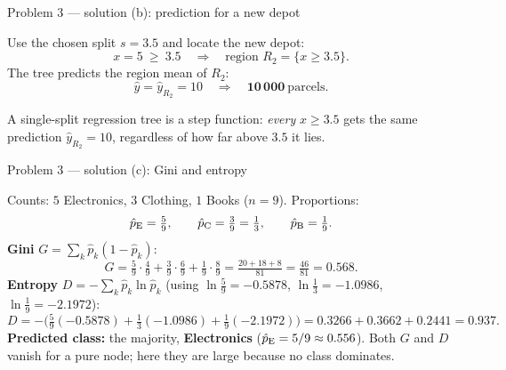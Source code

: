 \documentclass[aspectratio=169,11pt]{beamer}
\begin{document}
\begin{frame}{Problem 3 --- solution (b): prediction for a new depot}
  \begin{solutionbox}[Solution P3(b) --- predict for {$x=5$} vans]
    Use the chosen split $s=3.5$ and locate the new depot:
    \[
      x=5\ \ge\ 3.5\quad\Longrightarrow\quad\text{region }R_2=\{x\ge3.5\}.
    \]
    The tree predicts the region mean of $R_2$:
    \[
      \hat y=\hat y_{R_2}=10\quad\Longrightarrow\quad\mathbf{10\,000}\ \text{parcels}.
    \]
    \begin{takeaway}
      A single-split regression tree is a step function: \emph{every} $x\ge3.5$ gets the same
      prediction $\hat y_{R_2}=10$, regardless of how far above $3.5$ it lies.
    \end{takeaway}
  \end{solutionbox}
\end{frame}

\begin{frame}{Problem 3 --- solution (c): Gini and entropy}
  \begin{solutionbox}
    Counts: $5$ Electronics, $3$ Clothing, $1$ Books ($n=9$). Proportions:
    \[
      \hat p_{\text E}=\tfrac59,\qquad\hat p_{\text C}=\tfrac39=\tfrac13,\qquad
      \hat p_{\text B}=\tfrac19.
    \]
    \textbf{Gini} $G=\sum_k\hat p_k(1-\hat p_k)$:
    \[
      G=\tfrac59\cdot\tfrac49+\tfrac39\cdot\tfrac69+\tfrac19\cdot\tfrac89
       =\tfrac{20+18+8}{81}=\tfrac{46}{81}=\mathbf{0.568}.
    \]
    \textbf{Entropy} $D=-\sum_k\hat p_k\ln\hat p_k$ (using $\ln\tfrac59=-0.5878$,
    $\ln\tfrac13=-1.0986$, $\ln\tfrac19=-2.1972$):
    \[
      D=-\bigl(\tfrac59(-0.5878)+\tfrac13(-1.0986)+\tfrac19(-2.1972)\bigr)
       =0.3266+0.3662+0.2441=\mathbf{0.937}.
    \]
    \textbf{Predicted class:} the majority, \textbf{Electronics} ($\hat p_{\text E}=5/9\approx0.556$).
    Both $G$ and $D$ vanish for a pure node; here they are large because no class dominates.
  \end{solutionbox}
\end{frame}
\end{document}
